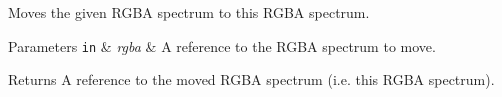 Moves the given R\+G\+BA spectrum to this R\+G\+BA spectrum.


\begin{DoxyParams}[1]{Parameters}
\mbox{\tt in}  & {\em rgba} & A reference to the R\+G\+BA spectrum to move. \\
\hline
\end{DoxyParams}
\begin{DoxyReturn}{Returns}
A reference to the moved R\+G\+BA spectrum (i.\+e. this R\+G\+BA spectrum). 
\end{DoxyReturn}
